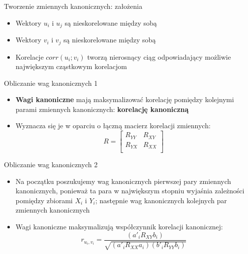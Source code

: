 \documentclass{beamer}
\begin{document}
\begin{frame}{Tworzenie zmiennych kanonicznych: założenia}
  \begin{itemize}
    \item Wektory $u_i$ i $u_j$ są nieskorelowane między sobą
    \item Wektory $v_i$ i $v_j$ są nieskorelowane między sobą
    \item Korelacje $corr(u_i; v_i)$ tworzą nierosnący ciąg odpowiadający możliwie największym cząstkowym korelacjom
  \end{itemize}
\end{frame}

\begin{frame}{Obliczanie wag kanonicznych 1}
  \begin{itemize}
  \item \textbf{Wagi kanoniczne} mają maksymalizować korelację pomiędzy kolejnymi parami zmiennych kanonicznych: \textbf{korelację kanoniczną}
  \item Wyznacza się je w oparciu o łączną macierz korelacji zmiennych:
    $$
    R =
    \begin{bmatrix}
      R_{YY} & R_{XY} \\
      R_{YX} & R_{XX} \\
    \end{bmatrix}
    $$
  \end{itemize}
\end{frame}

\begin{frame}{Obliczanie wag kanonicznych 2}
  \begin{itemize}
  \item Na początku poszukujemy wag kanonicznych pierwszej pary zmiennych kanonicznych, ponieważ ta para w największym stopniu wyjaśnia zależności pomiędzy zbiorami $X_i$ i $Y_i$; następnie wag kanonicznych kolejnych par zmiennych kanonicznych
  \item Wagi kanoniczne maksymalizują współczynnik korelacji kanonicznej:
    $$
    r_{u_i,v_i} = \frac{(a'_iR_{XY}b_i)}{\sqrt{(a'_iR_{XX}a_i)(b'_iR_{YY}b_i)}}
    $$
  \end{itemize}
\end{frame}
\end{document}
